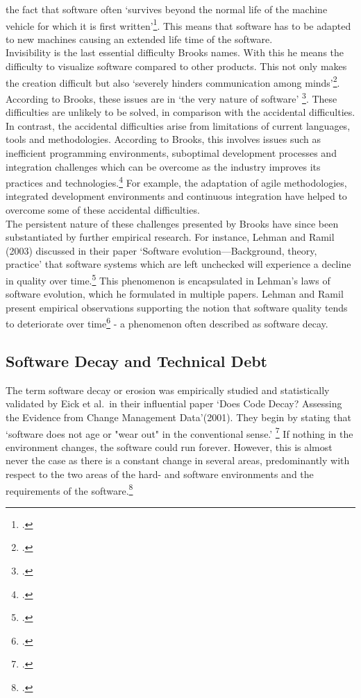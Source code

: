 the fact that software often `survives beyond the normal life of the machine vehicle for which it is first written'\footcite[4]{brooksNoSilverBullet1987}. This means that software has to be adapted to new machines causing an extended life time of the software.\\
Invisibility is the last essential difficulty Brooks names. With this he means the difficulty to visualize software compared to other products. This not only makes the creation difficult but also `severely hinders communication among minds'\footcite[4]{brooksNoSilverBullet1987}.
According to Brooks, these issues are in `the very nature of software' \footcite[2]{brooksNoSilverBullet1987}. These difficulties are unlikely to be solved, in comparison with the accidental difficulties.\\

In contrast, the accidental difficulties arise from limitations of current languages, tools and methodologies. According to Brooks, this involves issues such as inefficient programming environments, suboptimal development processes and integration challenges which can be overcome as the industry improves its practices and technologies.\footcite[5-6]{brooksNoSilverBullet1987}
For example, the adaptation of agile methodologies, integrated development environments and continuous integration have helped to overcome some of these accidental difficulties.\\

The persistent nature of these challenges presented by Brooks have since been substantiated by further empirical research. For instance, Lehman and Ramil (2003) discussed in their paper `Software evolution—Background, theory, practice' that software systems which are left unchecked will experience a decline in quality over time.\footcite[34]{lehmanSoftwareEvolutionBackground2003}
This phenomenon is encapsulated in Lehman's laws of software evolution, which he formulated in multiple papers.  Lehman and Ramil present empirical observations supporting the notion that software quality tends to deteriorate over time\footcite[42]{lehmanSoftwareEvolutionBackground2003} - a phenomenon often described as
software decay.

\subsection{Software Decay and Technical Debt}
The term software decay or erosion was empirically studied and statistically validated by Eick et al.\ in their influential paper `Does Code Decay? Assessing the Evidence from Change Management Data'(2001). They begin by stating that `software does not age or "wear out" in the conventional sense.' \footcite[1]{eickDoesCodeDecay2001}
If nothing in the environment changes, the software could run forever. However, this is almost never the case as there is a constant change in several areas, predominantly with respect to the two areas of the hard- and software environments and the requirements of the software.\footcite[1]{eickDoesCodeDecay2001}\\

